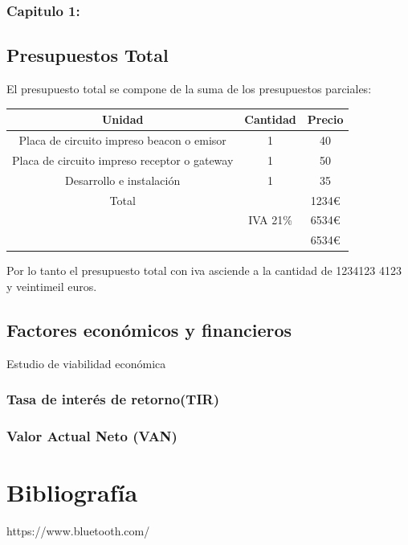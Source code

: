 \documentclass[a4paper ,12pt, onecolumn]{article}
\begin{document}
            \subsubsection{Capitulo 1: }
    \subsection{Presupuestos Total}
        El presupuesto total se compone de la suma de los presupuestos parciales:
        \begin{center}
            \begin{tabular}{||c | c |c ||} 
            \hline
            Unidad & Cantidad & Precio  \\ [0.5ex] 
            \hline\hline
            Placa de circuito impreso beacon o emisor & 1 & 40 \\ 
            Placa de circuito impreso receptor o gateway & 1 & 50 \\ 
            Desarrollo e instalación & 1 & 35 \\ 
            \hline
            \hline
            Total &  & 1234€ \\ 
             & IVA 21\%& 6534€ \\ 
             & & 6534€ \\ 
            \hline
            \end{tabular}
        \end{center}
        Por lo tanto el presupuesto total con iva asciende a la cantidad de 1234123 4123 y veintimeil euros.
    \subsection{Factores económicos y financieros}
    Estudio de viabilidad económica
        \subsubsection{Tasa de interés de retorno(TIR)}
        \subsubsection{Valor Actual Neto (VAN)}

\section{Bibliografía}
https://www.bluetooth.com/
\end{document}

